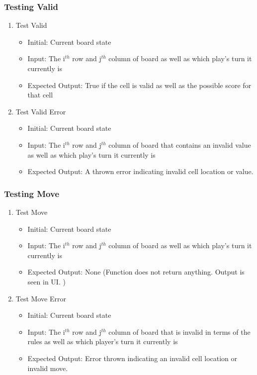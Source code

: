 \documentclass[12pt, titlepage]{article}
\begin{document}
\subsubsection {Testing Valid}
\begin{enumerate}
	\item Test Valid \begin{itemize}
		      \item Initial: Current board state
		      \item Input: The i$^{th}$ row and j$^{th}$ column of board as well as which play's turn it currently is
		      \item Expected Output: True if the cell is valid as well as the possible score for that cell
	      \end{itemize}
	\item Test Valid Error \begin{itemize}
		      \item Initial: Current board state
		      \item Input: The i$^{th}$ row and j$^{th}$ column of board that contains an invalid value as well as which play's turn it currently is
		      \item Expected Output: A thrown error indicating invalid cell location or value.
	      \end{itemize}
\end{enumerate}

\subsubsection {Testing Move}
\begin{enumerate}
	\item Test Move \begin{itemize}
		      \item Initial: Current board state
		      \item Input: The i$^{th}$ row and j$^{th}$ column of board as well as which play's turn it currently is
		      \item Expected Output: None (Function does not return anything. Output is seen in UI. )
	      \end{itemize}
	\item Test Move Error \begin{itemize}
		      \item Initial: Current board state
		      \item Input: The i$^{th}$ row and j$^{th}$ column of board that is invalid in terms of the rules as well as which player's turn it currently is
		      \item Expected Output: Error thrown indicating an invalid cell location or invalid move.
	      \end{itemize}
\end{enumerate}
\end{document}
